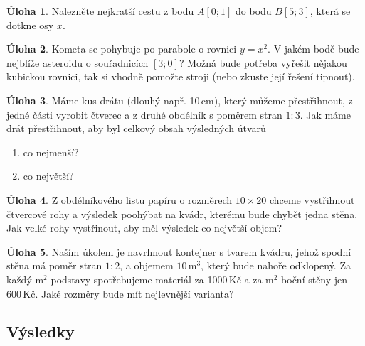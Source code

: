 \documentclass[12pt,a4paper]{article}
\theoremstyle{definition}
\newtheorem{uloha}{Úloha}
\begin{document}
\begin{uloha}
Nalezněte nejkratší cestu z bodu $A[0; 1]$ do bodu $B[5; 3]$, která se dotkne osy $x$.
\end{uloha}


\begin{uloha}
Kometa se pohybuje po parabole o rovnici $y = x^2$. V jakém bodě bude nejblíže asteroidu o souřadnicích $[3; 0]$? Možná bude potřeba vyřešit nějakou kubickou rovnici, tak si vhodně pomožte stroji (nebo zkuste její řešení tipnout).
\end{uloha}


\begin{uloha}
Máme kus drátu (dlouhý např. 10\,cm), který můžeme přestřihnout, z jedné části vyrobit čtverec a z druhé obdélník s poměrem stran $1:3$. Jak máme drát přestřihnout, aby byl celkový obsah výsledných útvarů
\begin{enumerate}[label={(\alph*)}]
	\item co nejmenší?
	\item co největší?
\end{enumerate}
\end{uloha}

\begin{uloha}
Z obdélníkového listu papíru o rozměrech $10\times 20$ chceme vystřihnout čtvercové rohy a výsledek poohýbat na kvádr, kterému bude chybět jedna stěna. Jak velké rohy vystřinout, aby měl výsledek co největší objem?
\end{uloha}

\begin{uloha}
Naším úkolem je navrhnout kontejner s tvarem kvádru, jehož spodní stěna má poměr stran $1:2$, a objemem $10\,$m$^3$, který bude nahoře odklopený. Za každý m$^2$ podstavy spotřebujeme materiál za 1000\,Kč a za m$^2$ boční stěny jen 600\,Kč. Jaké rozměry bude mít nejlevnější varianta?
\end{uloha}



\newpage

\subsection*{Výsledky}

\end{document}
